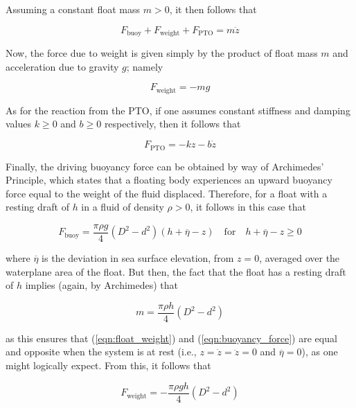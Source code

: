 \noindent Assuming a constant float mass $m>0$, it then follows that

\begin{equation}
	F_\textrm{buoy} + F_\textrm{weight} + F_\textrm{PTO} = m\ddot{z}
	\label{eqn:Newton_II_constant_mass}
\end{equation}

Now, the force due to weight is given simply by the product of float mass $m$ and acceleration due to gravity $g$; namely

\begin{equation}
	F_\textrm{weight} = -mg
	\label{eqn:float_weight}
\end{equation}

\noindent As for the reaction from the PTO, if one assumes constant stiffness and damping values $k\geq 0$ and $b\geq 0$ respectively, then it follows that

\begin{equation}
	F_\textrm{PTO} = -kz - b\dot{z}
	\label{eqn:PTO_reaction}
\end{equation}

\noindent Finally, the driving buoyancy force can be obtained by way of Archimedes' Principle, which states that a floating body experiences an upward buoyancy force equal to the weight of the fluid displaced. Therefore, for a float with a resting draft of $h$ in a fluid of density $\rho>0$, it follows in this case that

\begin{equation}
	F_\textrm{buoy} = \frac{\pi\rho g}{4}(D^2 - d^2)(h + \overline{\eta} - z)\quad\textrm{for}\quad h + \overline{\eta} - z \geq 0
	\label{eqn:buoyancy_force}
\end{equation}

\noindent where $\overline{\eta}$ is the deviation in sea surface elevation, from $z=0$, averaged over the waterplane area of the float. But then, the fact that the float has a resting draft of $h$ implies (again, by Archimedes) that

\begin{equation}
	m = \frac{\pi\rho h}{4}(D^2 - d^2)
	\label{eqn:float_mass}
\end{equation}

\noindent as this ensures that (\ref{eqn:float_weight}) and (\ref{eqn:buoyancy_force}) are equal and opposite when the system is at rest (i.e., $z=\dot{z}=\ddot{z}=0$ and $\overline{\eta}=0$), as one might logically expect. From this, it follows that

\begin{equation}
	F_\textrm{weight} = -\frac{\pi\rho gh}{4}(D^2 - d^2)
	\label{eqn:float_weight_Archimedes}
\end{equation}
 
